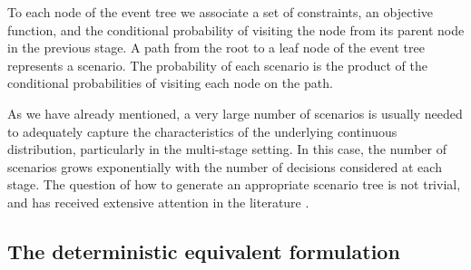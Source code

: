 To each node of the event tree we associate a set of constraints, an 
objective function, and the conditional probability of visiting the 
node from its parent node in the previous stage.
A path from the root to a leaf node of the event tree represents a 
scenario.
The probability of each scenario is the product of the 
conditional probabilities of visiting each node on the path.

As we have already mentioned, a very large number of scenarios is usually
needed to adequately capture the characteristics of the underlying
continuous distribution, particularly in the multi-stage setting.
In this case, the number of scenarios grows exponentially with the
number of decisions considered at each stage.
The question of how to generate an appropriate scenario tree
is not trivial, and has received extensive attention in the
literature 
\cite{DupacovaConsigliWallace,HoylandKautWallace,HoylandWallace,Pflug01}.

%
%
\subsection{The deterministic equivalent formulation}
\label{DetEqForm}


